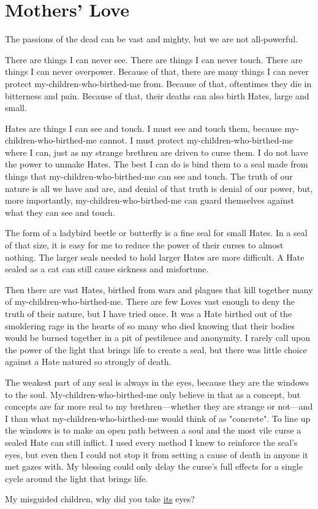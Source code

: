 \chapter{Mothers' Love}

\label{chap:TAIL-mothers-love}

The passions of the dead can be vast and mighty, but we are not all-powerful.

There are things I can never see. There are things I can never touch. There are things I can never overpower. Because of that, there are many things I can never protect my-children-who-birthed-me from. Because of that, oftentimes they die in bitterness and pain. Because of that, their deaths can also birth Hates, large and small.

Hates are things I can see and touch. I must see and touch them, because my-children-who-birthed-me cannot. I must protect my-children-who-birthed-me where I can, just as my strange brethren are driven to curse them. I do not have the power to unmake Hates. The best I can do is bind them to a seal made from things that my-children-who-birthed-me can see and touch. The truth of our nature is all we have and are, and denial of that truth is denial of our power, but, more importantly, my-children-who-birthed-me can guard themselves against what they can see and touch.

The form of a ladybird beetle or butterfly is a fine seal for small Hates. In a seal of that size, it is easy for me to reduce the power of their curses to almost nothing. The larger seals needed to hold larger Hates are more difficult. A Hate sealed as a cat can still cause sickness and misfortune.

Then there are vast Hates, birthed from wars and plagues that kill together many of my-children-who-birthed-me. There are few Loves vast enough to deny the truth of their nature, but I have tried once. It was a Hate birthed out of the smoldering rage in the hearts of so many who died knowing that their bodies would be burned together in a pit of pestilence and anonymity. I rarely call upon the power of the light that brings life to create a seal, but there was little choice against a Hate natured so strongly of death.

The weakest part of any seal is always in the eyes, because they are the windows to the soul. My-children-who-birthed-me only believe in that as a concept, but concepts are far more real to my brethren—whether they are strange or not—and I than what my-children-who-birthed-me would think of as "concrete". To line up the windows is to make an open path between a soul and the most vile curse a sealed Hate can still inflict. I used every method I knew to reinforce the seal's eyes, but even then I could not stop it from setting a cause of death in anyone it met gazes with. My blessing could only delay the curse's full effects for a single cycle around the light that brings life.

My misguided children, why did you take \hyperref[chap:SCP-023]{its} eyes?